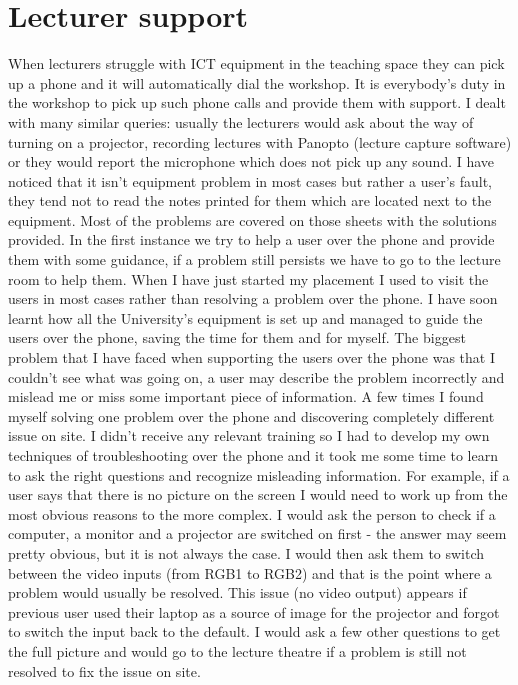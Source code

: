 \documentclass[10pt,a4paper,headinclude=true,twoside]{report}
\begin{document}
\section{Lecturer support}
When lecturers struggle with ICT equipment in the teaching space they can pick up a phone and it will automatically dial the workshop. It is everybody's duty in the workshop to pick up such phone calls and provide them with support. I dealt with many similar queries: usually the lecturers would ask about the way of turning on a projector, recording lectures with Panopto (lecture capture software) or they would report the microphone which does not pick up any sound. I have noticed that it isn't equipment problem in most cases but rather a user's fault, they tend not to read the notes printed for them which are located next to the equipment. Most of the problems are covered on those sheets with the solutions provided. In the first instance we try to help a user over the phone and provide them with some guidance, if a problem still persists we have to go to the lecture room to help them. When I have just started my placement I used to visit the users in most cases rather than resolving a problem over the phone. I have soon learnt how all the University's equipment is set up and managed to guide the users over the phone, saving the time for them and for myself. The biggest problem that I have faced when supporting the users over the phone was that I couldn't see what was going on, a user may describe the problem incorrectly and mislead me or miss some important piece of information. A few times I found myself solving one problem over the phone and discovering completely different issue on site. I didn't receive any relevant training so I had to develop my own techniques of troubleshooting over the phone and it took me some time to learn to ask the right questions and recognize misleading information. For example, if a user says that there is no picture on the screen I would need to work up from the most obvious reasons to the more complex. I would ask the person to check if a computer, a monitor and a projector are switched on first - the answer may seem pretty obvious, but it is not always the case. I would then ask them to switch between the video inputs (from RGB1 to RGB2) and that is the point where a problem would usually be resolved. This issue (no video output) appears if previous user used their laptop as a source of image for the projector and forgot to switch the input back to the default. I would ask a few other questions to get the full picture and would go to the lecture theatre if a problem is still not resolved to fix the issue on site.
\end{document}
